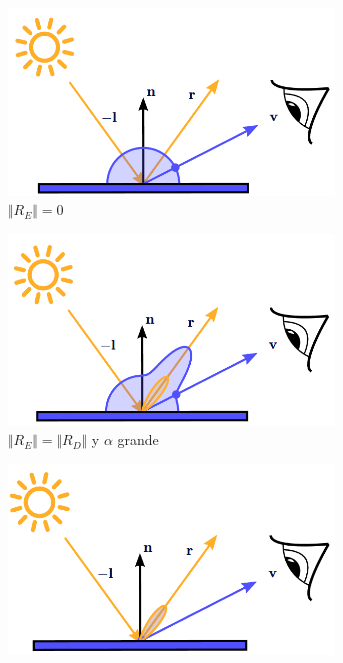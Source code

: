 \begin{figure}[!h]
     \begin{subfigure}[b]{0.45\linewidth}
        \centering
        \includegraphics[width=0.95\textwidth]{Plantilla-TFG-master/img/ks0kd1.png}
        \caption{$\Vert R_E\Vert = 0$}
     \end{subfigure}
     \hfill
     \begin{subfigure}[b]{0.45\linewidth}
        \centering
        \includegraphics[width=0.95\textwidth]{Plantilla-TFG-master/img/ks1kd1.png}
        \caption{$\Vert R_E\Vert =\Vert R_D\Vert$ y $\alpha$ grande}
     \end{subfigure}
     \hfill
     \begin{subfigure}[b]{0.45\linewidth}
        \centering
        \includegraphics[width=0.95\textwidth]{Plantilla-TFG-master/img/ks1kd0.png}

\end{subfigure}
\end{figure}
